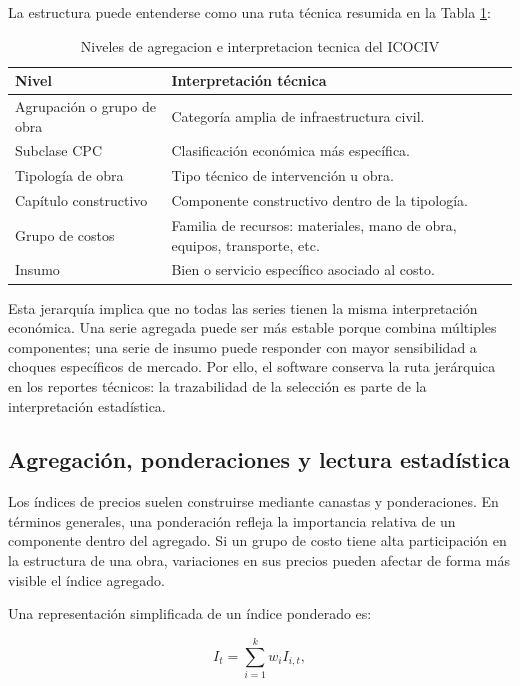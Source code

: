 La estructura puede entenderse como una ruta técnica resumida en la Tabla \ref{tab:niveles_agregacion_icociv_legacy}:

\begin{table}[H]
\centering
\caption{Niveles de agregacion e interpretacion tecnica del ICOCIV}
\label{tab:niveles_agregacion_icociv_legacy}
\begin{tabular}{ll}
\toprule
\textbf{Nivel} & \textbf{Interpretación técnica} \\
\midrule
Agrupación o grupo de obra & Categoría amplia de infraestructura civil. \\
Subclase CPC & Clasificación económica más específica. \\
Tipología de obra & Tipo técnico de intervención u obra. \\
Capítulo constructivo & Componente constructivo dentro de la tipología. \\
Grupo de costos & Familia de recursos: materiales, mano de obra, equipos, transporte, etc. \\
Insumo & Bien o servicio específico asociado al costo. \\
\bottomrule
\end{tabular}
\end{table}

Esta jerarquía implica que no todas las series tienen la misma interpretación económica. Una serie agregada puede ser más estable porque combina múltiples componentes; una serie de insumo puede responder con mayor sensibilidad a choques específicos de mercado. Por ello, el software conserva la ruta jerárquica en los reportes técnicos: la trazabilidad de la selección es parte de la interpretación estadística.

\subsection{Agregación, ponderaciones y lectura estadística}

Los índices de precios suelen construirse mediante canastas y ponderaciones. En términos generales, una ponderación refleja la importancia relativa de un componente dentro del agregado. Si un grupo de costo tiene alta participación en la estructura de una obra, variaciones en sus precios pueden afectar de forma más visible el índice agregado.

Una representación simplificada de un índice ponderado es:

\begin{equation}
    I_t = \sum_{i=1}^{k} w_i I_{i,t},
    \label{eq:indice_ponderado}
\end{equation}

